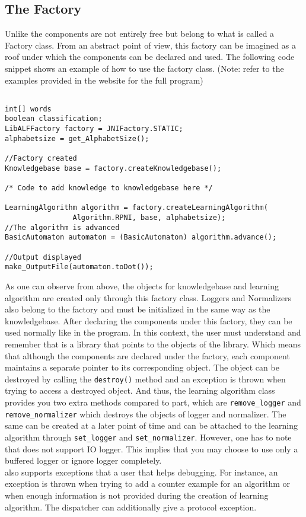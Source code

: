 \subsection{The \jalf Factory}
Unlike \libalf the components are not entirely free but belong to what is called a Factory class. From an abstract point of view, this factory can be imagined as a roof under which the components can be declared and used. The following code snippet shows an example of how to use the factory class. (Note: refer to the examples provided in the \libalf website for the full program)

\begin{lstlisting}

int[] words
boolean classification;
LibALFFactory factory = JNIFactory.STATIC;
alphabetsize = get_AlphabetSize();

//Factory created
Knowledgebase base = factory.createKnowledgebase();

/* Code to add knowledge to knowledgebase here */

LearningAlgorithm algorithm = factory.createLearningAlgorithm(
				Algorithm.RPNI, base, alphabetsize);
//The algorithm is advanced
BasicAutomaton automaton = (BasicAutomaton) algorithm.advance();

//Output displayed
make_OutputFile(automaton.toDot());

\end{lstlisting}

As one can observe from above, the objects for knowledgebase and learning algorithm are created only through this factory class. Loggers and Normalizers also belong to the factory and must be initialized in the same way as the knowledgebase. After declaring the components under this factory, they can be used normally like in the \cpp program. In this context, the user must understand and remember that \jalf is a library that points to the objects of the \cpp \libalf library. Which means that although the components are declared under the factory, each component maintains a separate pointer to its corresponding \cpp object. The object can be destroyed by calling the \texttt{destroy()} method and an exception is thrown when trying to access a destroyed object. And thus, the learning algorithm class provides you two extra methods compared to \libalf \cpp part, which are \texttt{remove\_logger} and \texttt{remove\_normalizer} which destroys the objects of logger and normalizer. The same can be created at a later point of time and can be attached to the learning algorithm through \texttt{set\_logger} and \texttt{set\_normalizer}. However, one has to note that \jalf does not support IO logger. This implies that you may choose to use only a buffered logger or ignore logger completely. \\
\jalf also supports exceptions that a user that helps debugging. For instance, an exception is thrown when trying to add a counter example for an \offline algorithm or when enough information is not provided during the creation of learning algorithm. The dispatcher can additionally give a protocol exception.\\

